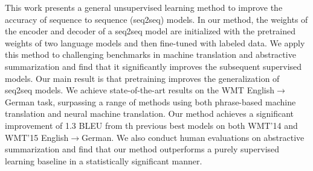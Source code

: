 This work presents a general unsupervised learning method to improve the accuracy of sequence to sequence (seq2seq) models. In our method, the weights of the encoder and decoder of a seq2seq model are initialized with the pretrained weights of two language models and then fine-tuned with labeled data. We apply this method to challenging benchmarks in machine translation and abstractive summarization and find that it significantly improves the subsequent supervised models.  Our main result is that pretraining improves the generalization of seq2seq models. We achieve state-of-the-art results on the WMT English$\rightarrow$German task, surpassing a range of methods using both phrase-based machine translation and neural machine translation. Our method achieves a significant improvement of 1.3 BLEU from th previous best models on both WMT'14 and WMT'15 English$\rightarrow$German. We also conduct human evaluations on abstractive summarization and find that our method outperforms a purely supervised learning baseline in a statistically significant manner.
